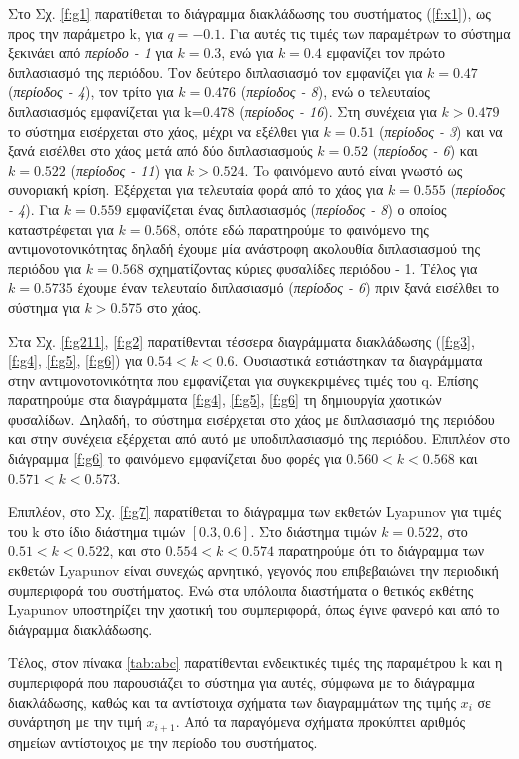 Στο Σχ. \ref{f:g1} παρατίθεται το διάγραμμα διακλάδωσης του συστήματος (\ref{f:x1}), ως προς την παράμετρο k, για $q =- 0.1$. Για αυτές τις τιμές των παραμέτρων το σύστημα ξεκινάει από \emph{περίοδο - 1} για $k=0.3$, ενώ για  $k = 0.4$ εμφανίζει τον πρώτο διπλασιασμό της περιόδου. Τον δεύτερο διπλασιασμό τον εμφανίζει για $k=0.47$ (\emph{περίοδος - 4}), τον τρίτο για $k=0.476$  (\emph{περίοδος -   8}), ενώ ο τελευταίος διπλασιασμός εμφανίζεται για k=0.478 (\emph{περίοδος - 16}). Στη συνέχεια για $k>0.479$ το σύστημα εισέρχεται στο χάος, μέχρι να εξέλθει για $k=0.51$ (\emph{περίοδος - 3}) και να ξανά εισέλθει στο χάος μετά από δύο διπλασιασμούς $k=0.52$ (\emph{περίοδος -   6}) και $k=0.522$ (\emph{περίοδος - 11}) για $k>0.524$. To φαινόμενο αυτό είναι γνωστό ως συνοριακή κρίση. Εξέρχεται για τελευταία φορά από το χάος για $k=0.555$ (\emph{περίοδος -   4}). Για $k=0.559$ εμφανίζεται ένας διπλασιασμός (\emph{περίοδος - 8}) ο οποίος καταστρέφεται για $k=0.568$, οπότε εδώ παρατηρούμε το φαινόμενο της αντιμονοτονικότητας δηλαδή έχουμε μία ανάστροφη ακολουθία διπλασιασμού της περιόδου για $k=0.568$ σχηματίζοντας κύριες φυσαλίδες περιόδου - 1. Τέλος για $k=0.5735$ έχουμε έναν τελευταίο διπλασιασμό (\emph{περίοδος - 6}) πριν ξανά εισέλθει το σύστημα για $k > 0.575$ στο χάος.

Στα Σχ. \ref{f:g211}, \ref{f:g2} παρατίθενται τέσσερα διαγράμματα διακλάδωσης 
(\ref{f:g3}, \ref{f:g4}, \ref{f:g5}, \ref{f:g6})
για $0.54<k<0.6$. Ουσιαστικά εστιάστηκαν τα διαγράμματα στην αντιμονοτονικότητα που εμφανίζεται για συγκεκριμένες τιμές του q. Επίσης παρατηρούμε στα διαγράμματα \ref{f:g4}, \ref{f:g5}, \ref{f:g6} τη δημιουργία χαοτικών φυσαλίδων. Δηλαδή, το σύστημα εισέρχεται στο χάος με διπλασιασμό της περιόδου και στην συνέχεια εξέρχεται από αυτό με υποδιπλασιασμό της περιόδου. Επιπλέον στο διάγραμμα \ref{f:g6} το φαινόμενο εμφανίζεται δυο φορές  για $0.560<k<0.568$ και $0.571<k<0.573$. 

Επιπλέον, στο Σχ. \ref{f:g7} παρατίθεται το διάγραμμα των εκθετών Lyapunov για τιμές του k στο ίδιο διάστημα τιμών $[0.3, 0.6]$. Στο διάστημα τιμών   $k=0.522$, στο $0.51<k<0.522$, και στο $0.554<k<0.574$ παρατηρούμε ότι το διάγραμμα των εκθετών Lyapunov είναι συνεχώς αρνητικό, γεγονός που επιβεβαιώνει την περιοδική συμπεριφορά του συστήματος. Ενώ στα υπόλοιπα διαστήματα ο θετικός εκθέτης Lyapunov υποστηρίζει την χαοτική του συμπεριφορά, όπως έγινε φανερό και από το διάγραμμα διακλάδωσης.

Τέλος, στον πίνακα \ref{tab:abc} παρατίθενται ενδεικτικές τιμές της παραμέτρου k και η συμπεριφορά που παρουσιάζει το σύστημα για αυτές, σύμφωνα με το διάγραμμα διακλάδωσης, καθώς και τα αντίστοιχα σχήματα των διαγραμμάτων της τιμής \(x_i\) σε συνάρτηση με την τιμή \(x_{i+1}\). Από τα παραγόμενα σχήματα προκύπτει αριθμός σημείων αντίστοιχος με την περίοδο του συστήματος.\\\\



